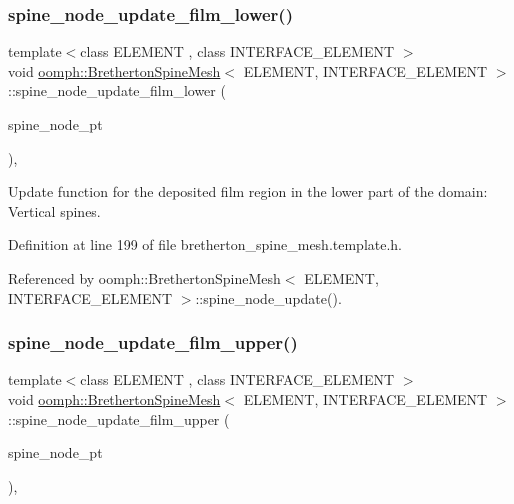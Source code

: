 \subsubsection{\texorpdfstring{spine\+\_\+node\+\_\+update\+\_\+film\+\_\+lower()}{spine\_node\_update\_film\_lower()}}
{\footnotesize\ttfamily template$<$class E\+L\+E\+M\+E\+NT , class I\+N\+T\+E\+R\+F\+A\+C\+E\+\_\+\+E\+L\+E\+M\+E\+NT $>$ \\
void \hyperlink{classoomph_1_1BrethertonSpineMesh}{oomph\+::\+Bretherton\+Spine\+Mesh}$<$ E\+L\+E\+M\+E\+NT, I\+N\+T\+E\+R\+F\+A\+C\+E\+\_\+\+E\+L\+E\+M\+E\+NT $>$\+::spine\+\_\+node\+\_\+update\+\_\+film\+\_\+lower (\begin{DoxyParamCaption}\item[{Spine\+Node $\ast$}]{spine\+\_\+node\+\_\+pt }\end{DoxyParamCaption})\hspace{0.3cm}{\ttfamily [inline]}, {\ttfamily [protected]}}



Update function for the deposited film region in the lower part of the domain\+: Vertical spines. 



Definition at line 199 of file bretherton\+\_\+spine\+\_\+mesh.\+template.\+h.



Referenced by oomph\+::\+Bretherton\+Spine\+Mesh$<$ E\+L\+E\+M\+E\+N\+T, I\+N\+T\+E\+R\+F\+A\+C\+E\+\_\+\+E\+L\+E\+M\+E\+N\+T $>$\+::spine\+\_\+node\+\_\+update().

\mbox{\label{classoomph_1_1BrethertonSpineMesh_a3919bd086252db283ee5242b4688f8d1}} 
\subsubsection{\texorpdfstring{spine\+\_\+node\+\_\+update\+\_\+film\+\_\+upper()}{spine\_node\_update\_film\_upper()}}
{\footnotesize\ttfamily template$<$class E\+L\+E\+M\+E\+NT , class I\+N\+T\+E\+R\+F\+A\+C\+E\+\_\+\+E\+L\+E\+M\+E\+NT $>$ \\
void \hyperlink{classoomph_1_1BrethertonSpineMesh}{oomph\+::\+Bretherton\+Spine\+Mesh}$<$ E\+L\+E\+M\+E\+NT, I\+N\+T\+E\+R\+F\+A\+C\+E\+\_\+\+E\+L\+E\+M\+E\+NT $>$\+::spine\+\_\+node\+\_\+update\+\_\+film\+\_\+upper (\begin{DoxyParamCaption}\item[{Spine\+Node $\ast$}]{spine\+\_\+node\+\_\+pt }\end{DoxyParamCaption})\hspace{0.3cm}{\ttfamily [inline]}, {\ttfamily [protected]}}



